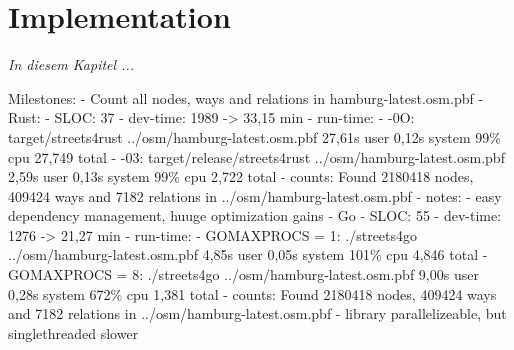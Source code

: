 \chapter{Implementation}
\label{chap:Implementation}

\textit{%
In diesem Kapitel ...
}
\bigskip


Milestones:
    - Count all nodes, ways and relations in hamburg-latest.osm.pbf
        - Rust:
            - SLOC: 37
            - dev-time: 1989 -> 33,15 min
            - run-time:
                - -0O: target/streets4rust ../osm/hamburg-latest.osm.pbf  27,61s user 0,12s system 99\% cpu 27,749 total
                - -03: target/release/streets4rust ../osm/hamburg-latest.osm.pbf  2,59s user 0,13s system 99\% cpu 2,722 total
            - counts: Found 2180418 nodes, 409424 ways and 7182 relations in ../osm/hamburg-latest.osm.pbf
            - notes:
                - easy dependency management, huuge optimization gains
        - Go
            - SLOC: 55
            - dev-time: 1276 -> 21,27 min
            - run-time:
                - GOMAXPROCS = 1: ./streets4go ../osm/hamburg-latest.osm.pbf  4,85s user 0,05s system 101\% cpu 4,846 total
                - GOMAXPROCS = 8: ./streets4go ../osm/hamburg-latest.osm.pbf  9,00s user 0,28s system 672\% cpu 1,381 total
            - counts: Found 2180418 nodes, 409424 ways and 7182 relations in ../osm/hamburg-latest.osm.pbf
                - library parallelizeable, but singlethreaded slower
